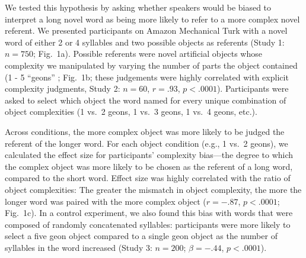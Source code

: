\documentclass[12pt]{article}
\begin{document}
We tested this hypothesis by asking whether speakers would be biased to interpret a long novel word as being more likely to refer to a more complex novel referent. We presented participants on Amazon Mechanical Turk with a novel word of either 2 or 4 syllables and two possible objects as referents (Study 1: $n = 750$; Fig.\ 1a). Possible referents were novel artificial objects whose complexity we manipulated by varying the number of parts the object contained (1 - 5 ``geons'' \cite{biederman1987}; Fig.\ 1b; these judgements were highly correlated with explicit complexity judgments, Study 2: $n = 60$, $r = .93$, $p < .0001$). Participants were asked to select which object the word named for every unique combination of object complexities (1 vs.\ 2 geons, 1 vs.\ 3 geons, 1 vs.\ 4 geons, etc.).

Across conditions, the more complex object was more likely to be judged the referent of the longer word. For each object condition (e.g., 1 vs.\ 2 geons), we calculated the effect size for participants' complexity bias---the degree to which the complex object was more likely to be chosen as the referent of a long word, compared to the short word. Effect size was highly correlated with the ratio of object complexities: The greater the mismatch in object complexity, the more the longer word was paired with the more complex object ($r = -.87$, $p < .0001$; Fig.\ 1c). In a control experiment, we also found this bias with words that were composed of randomly concatenated syllables: participants were more likely to select a five geon object compared to a single geon object as the number of syllables in the word increased (Study 3: $n = 200$; $\beta=-.44$, $p <.0001$).
					
\end{document}
